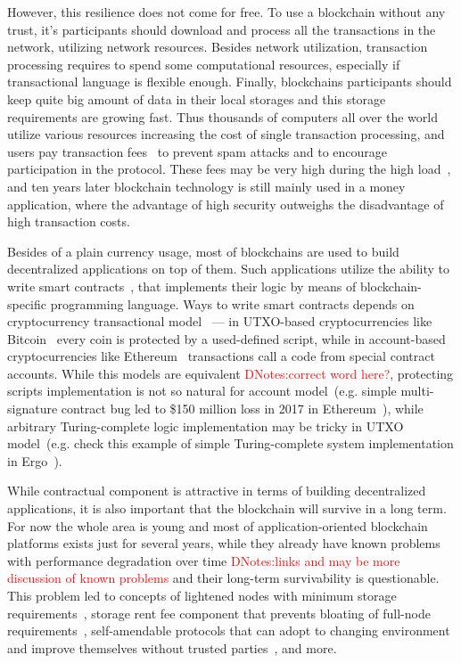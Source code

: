 \documentclass[]{article}
\newcommand{\dnote}[1]{{\textcolor{red}{DNotes:{#1}}}}
\newcommand{\Ergo}{Ergo}
\begin{document}
    However, this resilience does not come for free.
    To use a blockchain without any trust, it's participants should download and process all the transactions in
    the network, utilizing network resources.
    Besides network utilization, transaction processing requires to spend some computational resources,
    especially if transactional language is flexible enough.
    Finally, blockchains participants should keep quite big amount of data in their local storages and
    this storage requirements are growing fast.
    Thus thousands of computers all over the world utilize various resources
    increasing the cost of single transaction processing,
    and users pay transaction fees~\cite{chepurnoy2018systematic} to prevent spam attacks and
    to encourage participation in the protocol.
    These fees may be very high during the high load~\cite{bitcoinFees},
    and ten years later blockchain technology is still mainly used in a money application, where the advantage of
    high security outweighs the disadvantage of high transaction costs.

    Besides of a plain currency usage, most of blockchains are used to build decentralized applications on top of them.
    Such applications utilize the ability to write smart contracts~\cite{szabo1994smart}, that implements their logic
    by means of blockchain-specific programming language.
    Ways to write smart contracts depends on cryptocurrency transactional model~\cite{zahnentferner2018chimeric} ---
    in UTXO-based cryptocurrencies like Bitcoin~\cite{nakamoto2008bitcoin} every coin is protected by a used-defined script,
    while in account-based cryptocurrencies like Ethereum~\cite{ethWhitepaper} transactions call a code from special contract accounts.
    While this models are equivalent \dnote{correct word here?}, protecting scripts implementation is not so natural for
    account model~(e.g. simple multi-signature contract bug led to \$150 million loss in 2017 in Ethereum~\cite{parityLock}),
    while arbitrary Turing-complete logic implementation may be tricky in UTXO model~(e.g. check this example of
    simple Turing-complete system implementation in \Ergo{}~\cite{chepurnoy2018self}).

    While contractual component is attractive in terms of building decentralized applications,
    it is also important that the blockchain will survive in a long term.
    For now the whole area is young and most of application-oriented blockchain platforms exists just for several years,
    while they already have known problems with performance degradation over time \dnote{links and may be more discussion of known problems}
    and their long-term survivability is questionable.
    This problem led to concepts of lightened nodes with minimum storage requirements~\cite{reyzin2017improving},
    storage rent fee component that prevents bloating of full-node requirements~\cite{chepurnoy2018systematic},
    self-amendable protocols that can adopt to changing environment and improve themselves without
    trusted parties~\cite{goodman2014tezos}, and more.
\end{document}
